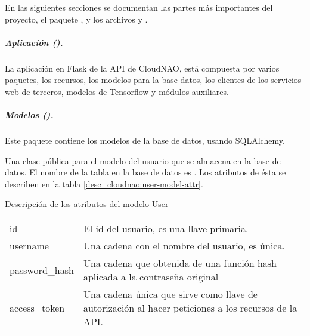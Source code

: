 En las siguientes secciones se documentan las partes más importantes del
proyecto, el paquete , y los
archivos  y .


\subparagraph{Aplicación ().}
\label{\detokenize{chapter_two/desc_cloudnao:aplicacion-app}}\label{\detokenize{chapter_two/desc_cloudnao:module-app}}
La aplicación en Flask de la API de CloudNAO, está compuesta por varios paquetes,
los recursos, los modelos para la base datos, los clientes de los servicios web de
terceros, modelos de Tensorflow y módulos auxiliares.


\subparagraph{Modelos ().}
\label{\detokenize{chapter_two/desc_cloudnao:module-app.models}}\label{\detokenize{chapter_two/desc_cloudnao:modelos-models}}
Este paquete contiene los modelos de la base de datos, usando SQLAlchemy.
\newline
{}\label{\detokenize{chapter_two/desc_cloudnao:module-app.models.user_model}}\label{\detokenize{chapter_two/desc_cloudnao:module-user_model}}


Una clase pública para el modelo del usuario que se almacena en la base
de datos.
El nombre de la tabla en la base de datos es . Los atributos de ésta
se describen en la tabla \ref{desc_cloudnao:user-model-attr}.

\begin{savenotes}\sphinxattablestart
\centering
{}
\caption{Descripción de los atributos del modelo User\label{desc_cloudnao:user-model-attr}}
\sphinxaftercaption
\begin{tabulary}{\linewidth}[t]{|T|T|}
\hline
{}\relax &\relax \\
\hline
id
&
El id del usuario, es una llave primaria.
\\
\hline
username
&
Una cadena con el nombre del usuario, es única.
\\
\hline
password\_hash
&
Una cadena que obtenida de una función hash aplicada a la contraseña original
\\
\hline
access\_token
&
Una cadena única que sirve como llave de autorización al hacer peticiones a los recursos de la API.
\\
\hline
\end{tabulary}
\par
\sphinxattableend\end{savenotes}

